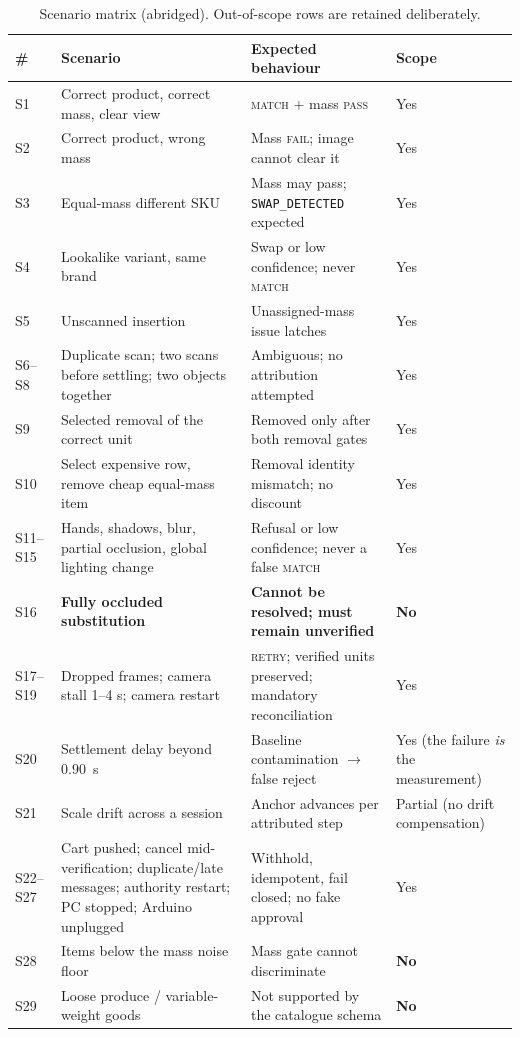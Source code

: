 \documentclass[conference]{IEEEtran}
\begin{document}
\begin{table}[!t]
\caption{Scenario matrix (abridged). Out-of-scope rows are retained deliberately.}
\label{tab:scen}
\centering
\footnotesize
\renewcommand{\arraystretch}{1.15}
\begin{tabular}{@{}p{}p{}p{}p{}@{}}
\toprule
\# & Scenario & Expected behaviour & Scope \\
\midrule
S1 & Correct product, correct mass, clear view & \textsc{match} + mass \textsc{pass} & Yes \\
S2 & Correct product, wrong mass & Mass \textsc{fail}; image cannot clear it & Yes \\
S3 & Equal-mass different SKU & Mass may pass; \texttt{SWAP\_DETECTED} expected & Yes \\
S4 & Lookalike variant, same brand & Swap or low confidence; never \textsc{match} & Yes \\
S5 & Unscanned insertion & Unassigned-mass issue latches & Yes \\
S6--S8 & Duplicate scan; two scans before settling; two objects together & Ambiguous; no attribution attempted & Yes \\
S9 & Selected removal of the correct unit & Removed only after both removal gates & Yes \\
S10 & Select expensive row, remove cheap equal-mass item & Removal identity mismatch; no discount & Yes \\
S11--S15 & Hands, shadows, blur, partial occlusion, global lighting change & Refusal or low confidence; never a false \textsc{match} & Yes \\
S16 & \textbf{Fully occluded substitution} & \textbf{Cannot be resolved; must remain unverified} & \textbf{No} \\
S17--S19 & Dropped frames; camera stall 1--4 s; camera restart & \textsc{retry}; verified units preserved; mandatory reconciliation & Yes \\
S20 & Settlement delay beyond $0.90$~s & Baseline contamination $\rightarrow$ false reject & Yes (the failure \emph{is} the measurement) \\
S21 & Scale drift across a session & Anchor advances per attributed step & Partial (no drift compensation) \\
S22--S27 & Cart pushed; cancel mid-verification; duplicate/late messages; authority restart; PC stopped; Arduino unplugged & Withhold, idempotent, fail closed; no fake approval & Yes \\
S28 & Items below the mass noise floor & Mass gate cannot discriminate & \textbf{No} \\
S29 & Loose produce / variable-weight goods & Not supported by the catalogue schema & \textbf{No} \\
\bottomrule
\end{tabular}
\end{table}
\end{document}
